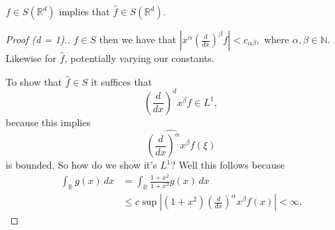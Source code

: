 \begin{theorem}
	\( f \in S( \mathbb{R}^{d}) \) implies that \( \hat f \in S( \mathbb{R}^{d}) \).
\end{theorem}
\begin{proof}[Proof (d = 1).]
	\( f \in S \) then we have that \( \left| x^{\alpha} \left( \frac{d}{dx} \right)^{\beta} f \right| < c_{\alpha \beta}, \) where \( \alpha, \beta \in \mathbb{N} \). Likewise for \( \hat f \), potentially varying our constants.

	To show that \( \hat f \in S \) it suffices that
	\[ \left( \frac{d}{dx} \right)^{d} x^{\beta}f \in L^{1},  \]
	because this implies
	\[ \widehat{\left( \frac{d}{dx} \right)^{\alpha} x^{\beta} f}( \xi) \]
	is bounded. So how do we show it's \( L^{1} \)? Well this follows because
	\begin{align*} 
		\int_{\mathbb{R}} g(x) \, dx &= \int_{\mathbb{R}} \frac{1 + x^{2}}{1+ x^{2}}g(x) \, dx  \\
																 &\le c \sup \left| (1 + x^{2}) \left( \frac{d}{dx} \right)^{\alpha} x^{\beta} f(x) \right| < \infty.
	\end{align*}


\end{proof}
